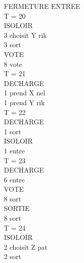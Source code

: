 \documentclass[12pt]{article} %
\begin{document}
\begin{multicols}{3}
{			\noindent FERMETURE ENTREE\\
			
			\noindent T = 20\\
			\hspace*{5mm} ISOLOIR\\
			\hspace*{12mm} 3 choisit Y rik\\
			\hspace*{12mm} 3 sort\\
			\hspace*{5mm} VOTE\\
			\hspace*{12mm} 8 vote\\
			T = 21\\
			\hspace*{5mm} DECHARGE\\
			\hspace*{12mm} 1 prend X nel\\
			\hspace*{12mm} 1 prend Y rik\\
			T = 22\\
			\hspace*{5mm} DECHARGE\\
			\hspace*{12mm} 1 sort\\
			\hspace*{5mm} ISOLOIR\\
			\hspace*{12mm} 1 entre\\
			T = 23\\
			\hspace*{5mm} DECHARGE\\
			\hspace*{12mm} 6 entre\\
			\hspace*{5mm} VOTE\\
			\hspace*{12mm} 8 sort\\
			\hspace*{5mm} SORTIE\\
			\hspace*{12mm} 8 sort\\
			T = 24\\
			\hspace*{5mm} ISOLOIR\\
			\hspace*{12mm} 2 choisit Z pat\\
			\hspace*{12mm} 2 sort\\
}
\end{multicols}
\end{document}
